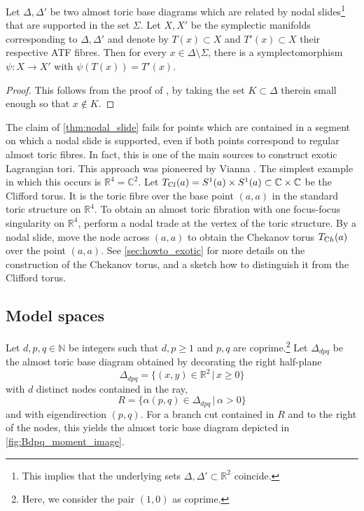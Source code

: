 \documentclass[AIF,Unicode,manuscript]{cedram}
\begin{document}
\begin{lemma}
    \label{thm:nodal_slide}
    Let $\Delta, \Delta'$ be two almost toric base diagrams which are related by nodal slides\footnote{This implies that the underlying sets $\Delta, \Delta' \subset \mathbb{R}^2$ coincide.} that are supported in the set $\Sigma$.
Let $X,X'$ be the symplectic manifolds corresponding to $\Delta,\Delta'$ and denote by $T(x) \subset X$ and $T'(x) \subset X$ their respective ATF fibres.
Then for every $x \in \Delta \setminus \Sigma$, there is a symplectomorphism $\psi \colon X \rightarrow X'$ with $\psi(T(x)) = T'(x)$.
\end{lemma}

\begin{proof}
    This follows from the proof of \cite[Theorem 8.10]{evans2021atfs}, by taking the set $K \subset \Delta$ therein small enough so that $x \notin K$.
\end{proof}

\begin{remark}
    \label{rk:slides_ray}
    The claim of \cref{thm:nodal_slide} fails for points which are contained in a segment on which a nodal slide is supported, even if both points correspond to regular almost toric fibres.
In fact, this is one of the main sources to construct exotic Lagrangian tori.
This approach was pioneered by Vianna \cite{Via16,Via17}.
The simplest example in which this occurs is $\mathbb{R}^4 = \mathbb{C}^2$.
Let $T_{\text Cl}(a) = S^1(a) \times S^1(a) \subset \mathbb{C} \times \mathbb{C}$ be the Clifford torus.
It is the toric fibre over the base point $(a,a)$ in the standard toric structure on $\mathbb{R}^4$.
To obtain an almost toric fibration with one focus-focus singularity on $\mathbb{R}^4$, perform a nodal trade at the vertex of the toric structure.
By a nodal slide, move the node across $(a,a)$ to obtain the Chekanov torus $T_{\text Ch}(a)$ over the point $(a,a)$.
See \cref{sec:howto_exotic} for more details on the construction of the Chekanov torus, and a sketch how to distinguish it from the Clifford torus.
\end{remark}


\subsection{Model spaces}
\label{sec:modelspaces}

Let $d,p,q \in \mathbb{N}$ be integers such that $d,p≥1$ and $p,q$ are coprime.\footnote{Here, we consider the pair $(1,0)$ as coprime.}
Let $\Delta_{dpq}$ be the almost toric base diagram obtained by decorating the right half-plane
$$\Delta_{dpq} = \{ (x,y) \in \mathbb{R}^2 \, \vert \, x ≥ 0 \}$$
with $d$ distinct nodes contained in the ray,
\begin{equation}
  \label{eqn:eigenline}
  R = \{\alpha (p,q) \in \Delta_{dpq} \, \vert \, \alpha > 0 \}
\end{equation}
and with eigendirection $(p,q)$.
For a branch cut contained in $R$ and to the right of the nodes, this yields the almost toric base diagram depicted in \cref{fig:Bdpq_moment_image}.
\end{document}
